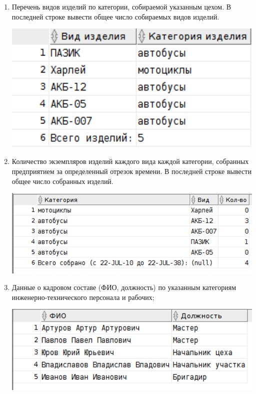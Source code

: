 \begin{enumerate}

    \item Перечень видов изделий по категории, собираемой указанным цехом.
    В последней строке вывести общее число собираемых видов изделий.

    

    \includegraphics[width=14cm]{./screenshots/results/result1.png}

    \item Количество экземпляров изделий каждого вида каждой категории, собранных предприятием за определенный отрезок времени.
    В последней строке вывести общее число собранных изделий.

    

    \includegraphics[width=14cm]{./screenshots/results/result2.png}

    \item Данные о кадровом составе (ФИО, должность) по указанным категориям инженерно-технического персонала и рабочих;

    

    \includegraphics[width=14cm]{./screenshots/results/result3.png}


\end{enumerate}
